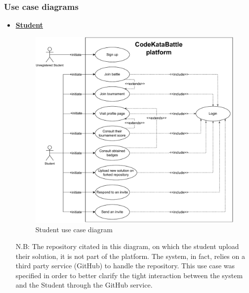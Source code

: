 \documentclass{article}
\begin{document}
{%
\newpage

\subsubsection{Use case diagrams}
\begin{itemize}
    \item \underline{\large{\textbf{Student}}}
          \begin{figure}[H]
              \centering
              \includegraphics[scale=0.55]{images/3.2.2_UseCaseDiagrams/CaseDiagramStudent.pdf}
              \caption{Student use case diagram}
              \label{fig:studentUseCaseDiagram}
          \end{figure}

          N.B: The repository citated in this diagram, on which the student upload their solution, it is not
          part of the platform. The system, in fact, relies on a third party service (GitHub) to handle the repository.
          This use case was specified in order to better clarify the tight interaction between the system and the Student through the GitHub service.

          \newpage


\end{itemize}}
\end{document}
